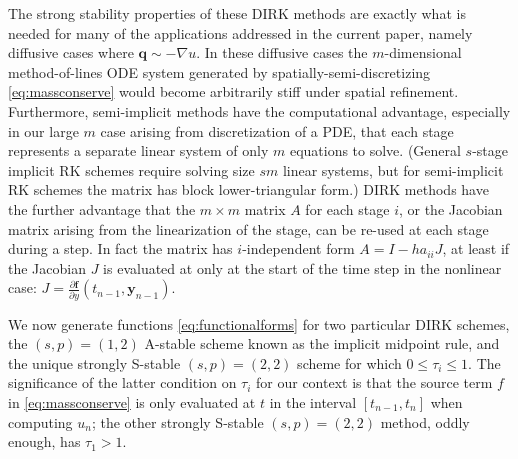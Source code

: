 \documentclass[final,leqno,onefignum,onetabnum]{siamltex1213bueler}
\newcommand\bbf{\mathbf{f}}
\newcommand\bq{\mathbf{q}}
\newcommand\by{\mathbf{y}}
\renewcommand{\grad}{\nabla}
\begin{document}
The strong stability properties of these DIRK methods are exactly what is needed for many of the applications addressed in the current paper, namely diffusive cases where $\bq \sim - \grad u$.  In these diffusive cases the $m$-dimensional method-of-lines ODE system generated by spatially-semi-discretizing \eqref{eq:massconserve} would become arbitrarily stiff under spatial refinement.  Furthermore, semi-implicit methods have the computational advantage, especially in our large $m$ case arising from discretization of a PDE, that each stage represents a separate linear system of only $m$ equations to solve.  (General $s$-stage implicit RK schemes require solving size $sm$ linear systems, but for semi-implicit RK schemes the matrix has block lower-triangular form.)  DIRK methods have the further advantage that the $m\times m$ matrix $A$ for each stage $i$, or the Jacobian matrix arising from the linearization of the stage, can be re-used at each stage during a step. In fact the matrix has $i$-independent form $A = I - h a_{ii} J$, at least if the Jacobian $J$ is evaluated at only at the start of the time step in the nonlinear case: $J = \frac{\partial \bbf}{\partial y}(t_{n-1},\by_{n-1})$.

We now generate functions \eqref{eq:functionalforms} for two particular DIRK schemes, the $(s,p)=(1,2)$ A-stable scheme known as the implicit midpoint rule, and the unique strongly S-stable $(s,p)=(2,2)$ scheme for which $0\le \tau_i\le 1$.  The significance of the latter condition on $\tau_i$ for our context is that the source term $f$ in \eqref{eq:massconserve} is only evaluated at $t$ in the interval $[t_{n-1},t_n]$ when computing $u_n$; the other strongly S-stable $(s,p)=(2,2)$ method, oddly enough, has $\tau_1>1$.
\end{document}
